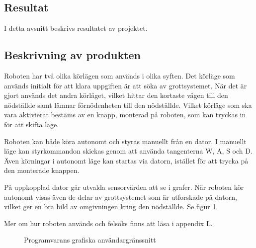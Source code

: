\documentclass[11pt]{article}
\begin{document}
\begin{flushleft}
\pagebreak

\section{Resultat}
I detta avsnitt beskrivs resultatet av projektet.

\subsection{Beskrivning av produkten}
Roboten har två olika körlägen som används i olika syften. Det körläge som används initialt för att klara uppgiften är att söka av grottsystemet. När det är gjort används det andra körläget, vilket hittar den kortaste vägen till den nödställde samt lämnar förnödenheten till den nödställde. Vilket körläge som ska vara aktivierat bestäms av en knapp, monterad på roboten, som kan tryckas in för att skifta läge. 


Roboten kan både köra autonomt och styras manuellt från en dator. I manuellt läge kan styrkommandon skickas genom att använda tangenterna W, A, S och D. Även körningar i autonomt läge kan startas via datorn, istället för att trycka på den monterade knappen. 

På uppkopplad dator går utvalda sensorvärden att se i grafer. När roboten kör autonomt visas även de delar av grottsystemet som är utforskade på datorn, vilket ger en bra bild av omgivningen kring den nödställde. Se figur \ref{software}.

Mer om hur roboten används och felsöks finns att läsa i appendix L.

\begin{figure}[H]
\centering
\noindent{}
	\caption{Programvarans grafiska användargränssnitt\label{software}}	
\end{figure}



\end{flushleft}
\end{document}
